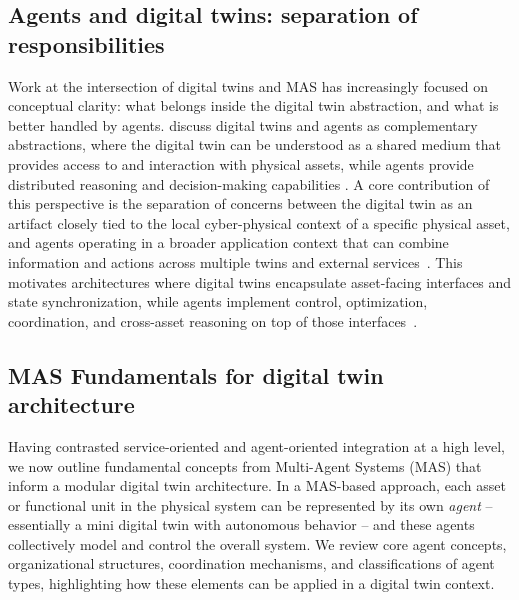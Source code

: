 \subsection{Agents and digital twins: separation of responsibilities}
Work at the intersection of digital twins and MAS has increasingly focused on conceptual clarity: what belongs inside the digital twin abstraction, and what is better handled by agents. \citeauthor{mariani2022_dt_agents_cross_fertilisation} discuss digital twins and agents as complementary abstractions, where the digital twin can be understood as a shared medium that provides access to and interaction with physical assets, while agents provide distributed reasoning and decision-making capabilities \cite{mariani2022_dt_agents_cross_fertilisation}.
A core contribution of this perspective is the separation of concerns between the digital twin as an artifact closely tied to the local cyber-physical context of a specific physical asset, and agents operating in a broader application context that can combine information and actions across multiple twins and external services~\cite{mariani2022_dt_agents_cross_fertilisation}.
This motivates architectures where digital twins encapsulate asset-facing interfaces and state synchronization, while agents implement control, optimization, coordination, and cross-asset reasoning on top of those interfaces~\cite{mariani2022_dt_agents_cross_fertilisation}.

\subsection{MAS Fundamentals for digital twin architecture}
Having contrasted service-oriented and agent-oriented integration at a high level, we now outline fundamental concepts from Multi-Agent Systems (MAS) that inform a modular digital twin architecture. In a MAS-based approach, each asset or functional unit in the physical system can be represented by its own \emph{agent} – essentially a mini digital twin with autonomous behavior – and these agents collectively model and control the overall system. We review core agent concepts, organizational structures, coordination mechanisms, and classifications of agent types, highlighting how these elements can be applied in a digital twin context.

